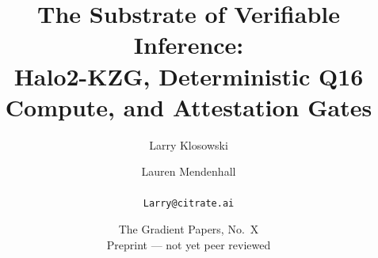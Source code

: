 
\title{\textbf{The Substrate of Verifiable Inference:}\\[4pt]
\large Halo2-KZG, Deterministic Q16 Compute, and Attestation Gates}
\author{Larry Klosowski \and Lauren Mendenhall\\[2pt]\CitrateAffil\\ \texttt{Larry@citrate.ai}}
\date{The Gradient Papers, No.~X \\ Preprint --- not yet peer reviewed}

\maketitle


